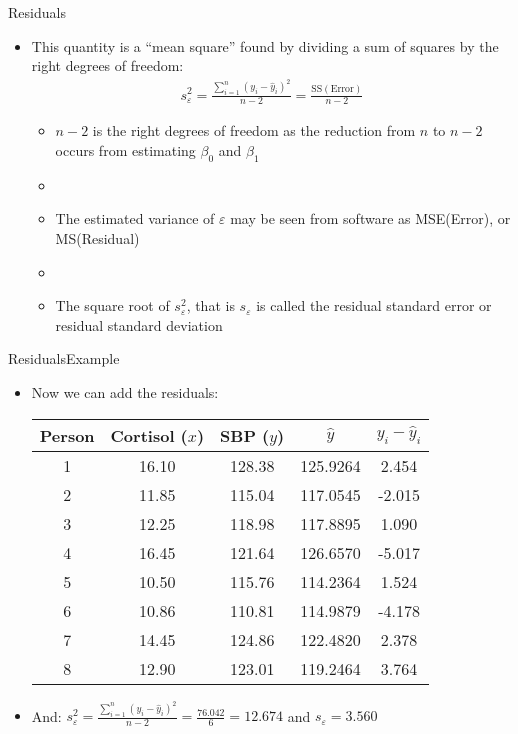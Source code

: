 \documentclass[xcolor=dvipsnames]{beamer}
\begin{document}
\begin{frame}{Residuals}
	\begin{itemize}
		\item This quantity is a ``mean square'' found by dividing a sum of squares by the right degrees of freedom:
		\begin{gather*}
		s^2_{\varepsilon} = \frac{\sum_{i=1}^{n}\left(y_i - \hat{y}_i\right)^2}{n-2} = \frac{\text{SS}(\text{Error})}{n-2}
		\end{gather*}
		\begin{itemize}
			\item $n-2$ is the right degrees of freedom as the reduction from $n$ to $n-2$ occurs from estimating $\beta_0$ and $\beta_1$
			\item[]
			\item The estimated variance of $\varepsilon$ may be seen from software as MSE(Error), or MS(Residual)
			\item[]
			\item The square root of $s_{\varepsilon}^2$, that is $s_{\varepsilon}$ is called the residual standard error or residual standard deviation
		\end{itemize}
	\end{itemize}
\end{frame}

\begin{frame}{Residuals}{Example}
	\begin{itemize}
		\item Now we can add the residuals:
		\vspace{1mm}
		\begin{center}
			\begin{tabular}{ccccc}
				\hline
				Person& Cortisol ($x$) & SBP ($y$)  & $\hat{y}$ & $y_i - \hat{y}_i$ \\ 
				\hline
				1 & 16.10 & 128.38  & 125.9264 & 2.454\\ 
				2 & 11.85 & 115.04  & 117.0545 & -2.015\\ 
				3 & 12.25 & 118.98  & 117.8895 & 1.090\\ 
				4 & 16.45 & 121.64  & 126.6570 & -5.017\\ 
				5 & 10.50 & 115.76  & 114.2364 & 1.524\\ 
				6 & 10.86 & 110.81  & 114.9879 & -4.178\\ 
				7 & 14.45 & 124.86  & 122.4820 & 2.378\\ 
				8 & 12.90 & 123.01  & 119.2464 &  3.764\\ 
				\hline
			\end{tabular}
		\end{center}
	\vspace{1mm}
	\item And: 	$s^2_{\varepsilon} = \frac{\sum_{i=1}^{n}\left(y_i - \hat{y}_i\right)^2}{n-2} = \frac{76.042}{6} = 12.674$ and $s_{\varepsilon}=3.560$
	\end{itemize}
\end{frame}
\end{document}
